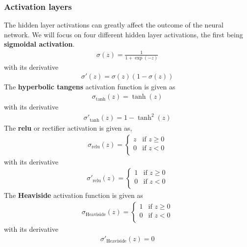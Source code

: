 \subsubsection{Activation layers} \label{sec:layer-acts}
The hidden layer activations can greatly affect the outcome of the neural network. We will focus on four different hidden layer activations, the first being \textbf{sigmoidal activation}.
\begin{align}
    \sigma (z) = \frac{1}{1 + \exp (-z)}
    \label{eq:act-sig}
\end{align}
with its derivative
\begin{align}
    \sigma'(z) = \sigma(z)(1 - \sigma(z))
    \label{eq:act-sig-der}
\end{align}
The \textbf{hyperbolic tangens} activation function is given as
\begin{align}
    \sigma_\mathrm{tanh}(z) = \tanh(z)
    \label{eq:act-tanh}
\end{align}
with its derivative
\begin{align}
    \sigma'_\mathrm{tanh}(z) = 1 - \tanh^2(z)
    \label{eq:act-tanh-der}
\end{align}
The \textbf{relu} or rectifier activation is given as,
\begin{align}
    \sigma_\mathrm{relu}(z) = 
    \begin{cases}
        z & \text{if } z \geq 0 \\
        0 & \text{if } z < 0 \\
    \end{cases}
    \label{eq:act-relu}
\end{align}
with its derivative
\begin{align}
    \sigma'_\mathrm{relu}(z) = 
    \begin{cases}
        1 & \text{if } z \geq 0 \\
        0 & \text{if } z < 0 \\
    \end{cases}
    \label{eq:act-relu-der}
\end{align}
The \textbf{Heaviside} activation function is given as
\begin{align}
    \sigma_\mathrm{Heaviside}(z) = 
    \begin{cases}
        1 & \text{if } z \geq 0 \\
        0 & \text{if } z < 0 \\
    \end{cases}
    \label{eq:act-heaviside}
\end{align}
with its derivative
\begin{align}
    \sigma'_\mathrm{Heaviside}(z) = 0
    \label{eq:act-heaviside-der}
\end{align}

